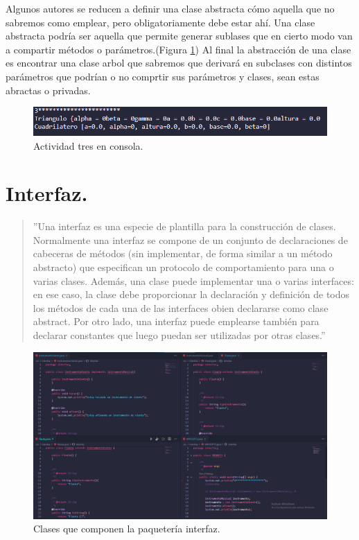 \documentclass[conference]{IEEEtran}
\begin{document}
        Algunos autores se reducen a definir una clase abstracta cómo aquella que no sabremos como emplear, pero obligatoriamente debe estar ahí.
        Una clase abstracta podría ser aquella que permite generar sublases que en cierto modo van a compartir métodos o parámetros.(Figura \ref{fig7})
        Al final la abstracción de una clase es encontrar una clase arbol que sabremos que derivará en subclases con distintos parámetros que podrían o no comprtir sus parámetros y clases, sean estas abractas o privadas. 
        
        \begin{figure}[htbp]
            \centerline{\includegraphics[scale=0.4]{./pics/7}}
            \caption{Actividad tres en consola.}
            \label{fig7}
        \end{figure}

    \section{Interfaz.}


        \begin{quote}
            ''Una interfaz es una especie de plantilla para la construcción de clases. Normalmente una interfaz se compone de un conjunto de declaraciones de cabeceras de métodos (sin implementar, de forma similar a un método abstracto) que especifican un protocolo de comportamiento para una o varias clases. Además, una clase puede implementar una o varias interfaces: en ese caso, la clase debe proporcionar la declaración y definición de todos los métodos de cada una de las interfaces obien declararse como clase abstract. Por otro lado, una interfaz puede emplearse también para declarar constantes que luego puedan ser utilizadas por otras clases.''\cite{IEEEexample:POOJ}
        \end{quote}

        \medskip{}
    
        \begin{figure}[htbp]
            \centerline{\includegraphics[scale=0.18]{./pics/8}}
            \caption{Clases que componen la paquetería interfaz.}
            \label{fig8}
        \end{figure}
\end{document}
